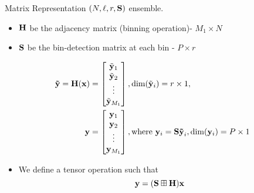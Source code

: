 \begin{frame}{Matrix Representation}
$(N,\ell,r,\mathbf{S})$ ensemble. 
\begin{itemize}
\item $\mathbf{H}$ be the adjacency matrix (binning operation)- $M_1 \times N$
\item $\mathbf{S}$ be the bin-detection matrix at each bin - $P \times r$
\end{itemize}
\begin{align*}
\mbf{\tilde{y}=H(x)}&= 
\begin{bmatrix}
   \tilde{\mbf{ y}}_{1} \\
   \tilde{ \mbf{y}}_{2} \\
    \vdots \\
   \tilde{\mbf{y}}_{M_1}
\end{bmatrix}
,\text{dim}(\tilde{\mbf{y}}_{i} )=r \times 1,
\\
\vspace{10pt}
\mbf{y}&= 
\begin{bmatrix}
   \mbf{ y}_{1}\\
    \mbf{y}_{2}  \\
    \vdots \\
    \mbf{y}_{M_1}
\end{bmatrix}
, \text{where } \mbf{y}_i= \mbf{S \tilde{y}}_{i}, \text{dim} (\mbf{y}_i)=P \times 1   
\end{align*}
\begin{itemize}
\item We define a tensor operation such that 
\begin{equation*}
\mathbf{y=(S\boxplus H)  x}
\end{equation*}
\end{itemize}
\end{frame}

